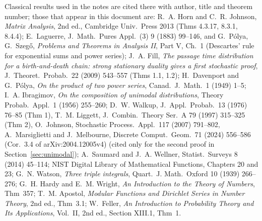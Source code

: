\documentclass[10pt,a4paper]{article}
\theoremstyle{plain}
\theoremstyle{definition}
\begin{document}
Classical results used in the notes are cited there with author, title and theorem number; those that appear in this document are: R.~A. Horn and C.~R. Johnson, \emph{Matrix Analysis}, 2nd ed., Cambridge Univ.\ Press 2013 (Thms 4.3.17, 8.3.1, 8.4.4); E.~Laguerre, J.\ Math.\ Pures Appl.\ (3) 9 (1883) 99--146, and G.~P\'olya, G.~Szeg\H{o}, \emph{Problems and Theorems in Analysis II}, Part V, Ch.~1 (Descartes' rule for exponential sums and power series); J.~A. Fill, \emph{The passage time distribution for a birth-and-death chain: strong stationary duality gives a first stochastic proof}, J.\ Theoret.\ Probab.\ 22 (2009) 543--557 (Thms 1.1, 1.2); H.~Davenport and G.~P\'olya, \emph{On the product of two power series}, Canad.\ J.\ Math.\ 1 (1949) 1--5; I.~A. Ibragimov, \emph{On the composition of unimodal distributions}, Theory Probab.\ Appl.\ 1 (1956) 255--260; D.~W. Walkup, J.\ Appl.\ Probab.\ 13 (1976) 76--85 (Thm 1), T.~M. Liggett, J.\ Combin.\ Theory Ser.\ A 79 (1997) 315--325 (Thm 2), O.~Johnson, Stochastic Process.\ Appl.\ 117 (2007) 791--802, A.~Marsiglietti and J.~Melbourne, Discrete Comput.\ Geom.\ 71 (2024) 556--586 (Cor.\ 3.4 of arXiv:2004.12005v4) (cited only for the second proof in Section~\ref{sec:unimodal}); A.~Saumard and J.~A. Wellner, Statist.\ Surveys 8 (2014) 45--114; NIST Digital Library of Mathematical Functions, Chapters 20 and 23; G.~N. Watson, \emph{Three triple integrals}, Quart.\ J. Math.\ Oxford 10 (1939) 266--276; G.~H. Hardy and E.~M. Wright, \emph{An Introduction to the Theory of Numbers}, Thm~357; T.~M. Apostol, \emph{Modular Functions and Dirichlet Series in Number Theory}, 2nd ed., Thm~3.1; W.~Feller, \emph{An Introduction to Probability Theory and Its Applications}, Vol.~II, 2nd ed., Section XIII.1, Thm~1.
\end{document}
